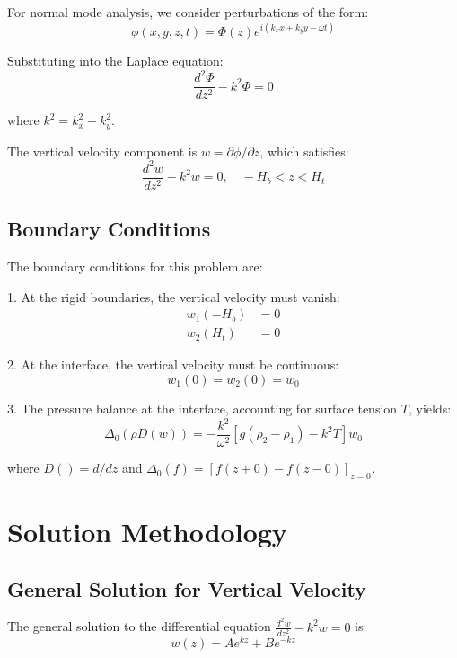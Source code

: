 \documentclass[12pt,a4paper]{article}
\begin{document}
For normal mode analysis, we consider perturbations of the form:
\begin{equation}
\phi(x,y,z,t) = \Phi(z)e^{i(k_x x + k_y y - \omega t)}
\end{equation}

Substituting into the Laplace equation:
\begin{equation}
\frac{d^2\Phi}{dz^2} - k^2\Phi = 0
\end{equation}

where $k^2 = k_x^2 + k_y^2$.

The vertical velocity component is $w = \partial\phi/\partial z$, which satisfies:
\begin{equation}
\frac{d^2 w}{dz^2} - k^2 w = 0, \quad -H_b < z < H_t
\end{equation}

\subsection{Boundary Conditions}
The boundary conditions for this problem are:

1. At the rigid boundaries, the vertical velocity must vanish:
\begin{align}
w_1(-H_b) &= 0 \\
w_2(H_t) &= 0
\end{align}

2. At the interface, the vertical velocity must be continuous:
\begin{equation}
w_1(0) = w_2(0) = w_0
\end{equation}

3. The pressure balance at the interface, accounting for surface tension $T$, yields:
\begin{equation}
\Delta_0(\rho D(w)) = -\frac{k^2}{\omega^2}[g(\rho_2 - \rho_1) - k^2T]w_0
\end{equation}

where $D() = d/dz$ and $\Delta_0(f) = [f(z+0) - f(z-0)]_{z=0}$.

\section{Solution Methodology}
\subsection{General Solution for Vertical Velocity}
The general solution to the differential equation $\frac{d^2 w}{dz^2} - k^2 w = 0$ is:
\begin{equation}
w(z) = Ae^{kz} + Be^{-kz}
\end{equation}
\end{document}
